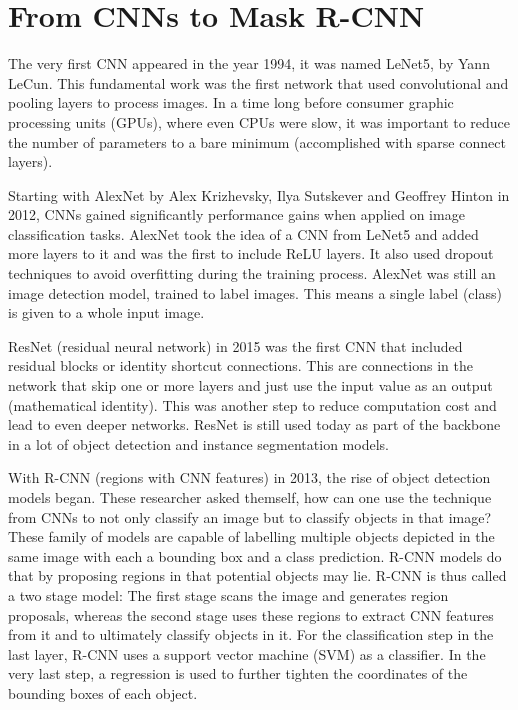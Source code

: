 \section{From CNNs to Mask R-CNN}

The very first CNN  appeared in the year 1994, it was named LeNet5, by Yann LeCun. This fundamental work was the first network that used convolutional and pooling layers to process images. In a time long before consumer graphic processing units (GPUs), where even CPUs were slow, it was important to reduce the number of parameters to a bare minimum (accomplished with sparse connect layers).

Starting with AlexNet by Alex Krizhevsky, Ilya Sutskever and Geoffrey Hinton in 2012, CNNs gained significantly performance gains when applied on image classification tasks. AlexNet took the idea of a CNN from LeNet5 and added more layers to it and was the first to include ReLU layers. It also used dropout techniques to avoid overfitting during the training process. AlexNet was still an image detection model, trained to label images. This means a single label (class) is given to a whole input image.

ResNet (residual neural network) in 2015 was the first CNN that included residual blocks or identity shortcut connections. This are connections in the network that skip one or more layers and just use the input value as an output (mathematical identity). This was another step to reduce computation cost and lead to even deeper networks. ResNet is still used today as part of the backbone in a lot of object detection and instance segmentation models.

With R-CNN (regions with CNN features) in 2013, the rise of object detection models began. These researcher asked themself, how can one use the technique from CNNs to not only classify an image but to classify objects in that image?  These family of models are capable of labelling multiple objects depicted in the same image with each a bounding box and a class prediction. R-CNN models do that by proposing regions in that potential objects may lie. R-CNN is thus called a two stage model: The first stage scans the image and generates region proposals, whereas the second stage uses these regions to extract CNN features from it and to ultimately classify objects in it. For the classification step in the last layer, R-CNN uses a support vector machine (SVM) as a classifier. In the very last step, a regression is used to further tighten the coordinates of the bounding boxes of each object. \cite{R-CNN}

